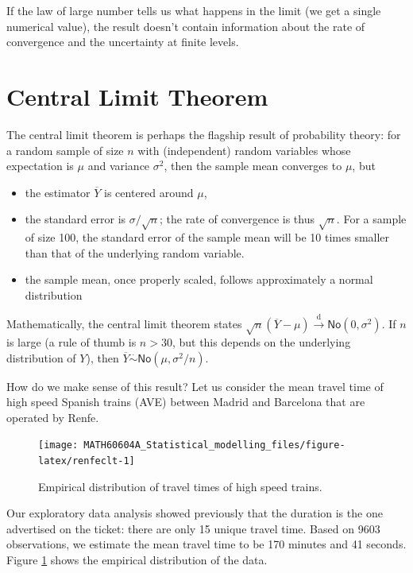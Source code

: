 \documentclass[
  11pt,
  letterpaper,
]{book}
\providecommand{\tightlist}{%
  \setlength{\itemsep}{0pt}\setlength{\parskip}{0pt}}
\theoremstyle{definition}
\theoremstyle{definition}
\theoremstyle{definition}
\theoremstyle{remark}
\begin{document}
If the law of large number tells us what happens in the limit (we get a single numerical value), the result doesn't contain information about the rate of convergence and the uncertainty at finite levels.

\hypertarget{CLT}{%
\section{Central Limit Theorem}\label{CLT}}

The central limit theorem is perhaps the flagship result of probability theory: for a random sample of size \(n\) with (independent) random variables whose expectation is \(\mu\) and variance \(\sigma^2\), then the sample mean converges to \(\mu\), but

\begin{itemize}
\tightlist
\item
  the estimator \(\overline{Y}\) is centered around \(\mu\),
\item
  the standard error is \(\sigma/\sqrt{n}\); the rate of convergence is thus \(\sqrt{n}\). For a sample of size 100, the standard error of the sample mean will be 10 times smaller than that of the underlying random variable.
\item
  the sample mean, once properly scaled, follows approximately a normal distribution
\end{itemize}

Mathematically, the central limit theorem states \(\sqrt{n}(\overline{Y}-\mu) \stackrel{\mathrm{d}}{\rightarrow} \mathsf{No}(0, \sigma^2)\). If \(n\) is large (a rule of thumb is \(n>30\), but this depends on the underlying distribution of \(Y\)), then \(\overline{Y} \stackrel{\cdot}{\sim} \mathsf{No}(\mu, \sigma^2/n)\).

How do we make sense of this result? Let us consider the mean travel time of high speed Spanish trains (AVE) between Madrid and Barcelona that are operated by Renfe.

\begin{figure}

{\centering \texttt{[image: MATH60604A\_Statistical\_modelling\_files/figure-latex/renfeclt-1]} 

}

\caption{Empirical distribution of travel times of high speed trains.}\label{fig:renfeclt}
\end{figure}

Our exploratory data analysis showed previously that the duration is the one advertised on the ticket: there are only 15 unique travel time. Based on 9603 observations, we estimate the mean travel time to be 170 minutes and 41 seconds. Figure \ref{fig:renfeclt} shows the empirical distribution of the data.
\end{document}
